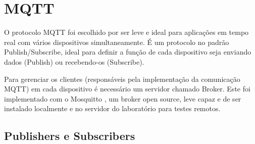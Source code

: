 \begin{table}[h!]
\caption{Comparativo MQTT X HTTP}
\label{tabela:mqttxhttp}
\end{table}



\section{MQTT}
\label{section:mqtt}

O protocolo MQTT foi escolhido por ser leve e ideal para aplicações em tempo real com vários dispositivos simultaneamente. É um protocolo no padrão Publish/Subscribe, ideal para definir a função de cada dispositivo seja enviando dados (Publish) ou recebendo-os (Subscribe).

Para gerenciar os clientes (responsáveis pela implementação da comunicação MQTT) em cada dispositivo é necessário um servidor chamado Broker. Este foi implementado com o Mosquitto \cite{mosquitto}, um broker open source, leve capaz e de ser instalado localmente e no servidor do laboratório para testes remotos.

\subsection{Publishers e Subscribers}
\label{subsection:publishers_subscribers}

